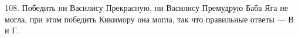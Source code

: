 108. Победить ни Василису Прекрасную, ни Василису Премудрую Баба Яга не могла, при этом победить Кикимору она могла, так что правильные ответы --- В и Г.\\
